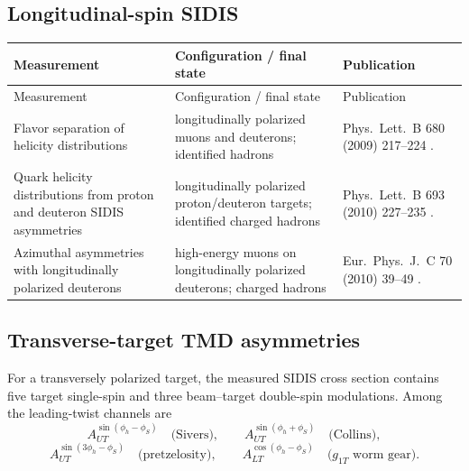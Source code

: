 \documentclass[11pt]{article}
\begin{document}
\subsection{Longitudinal-spin SIDIS}

\small
\begin{longtable}{@{}p{}p{}p{}@{}}
\toprule
Measurement & Configuration / final state & Publication \\ \midrule
\endfirsthead
\toprule
Measurement & Configuration / final state & Publication \\ \midrule
\endhead
Flavor separation of helicity distributions &
longitudinally polarized muons and deuterons; identified hadrons &
Phys.\ Lett.\ B 680 (2009) 217--224 \cite{COMPASS:helicityD2009}. \\

Quark helicity distributions from proton and deuteron SIDIS asymmetries &
longitudinally polarized proton/deuteron targets; identified charged hadrons &
Phys.\ Lett.\ B 693 (2010) 227--235 \cite{COMPASS:helicityHD2010}. \\

Azimuthal asymmetries with longitudinally polarized deuterons &
high-energy muons on longitudinally polarized deuterons; charged hadrons &
Eur.\ Phys.\ J.\ C 70 (2010) 39--49 \cite{COMPASS:longaz2010}. \\
\bottomrule
\end{longtable}
\normalsize

\subsection{Transverse-target TMD asymmetries}

For a transversely polarized target, the measured SIDIS cross section contains five target
single-spin and three beam--target double-spin modulations.  Among the leading-twist channels are
\[
 A_{UT}^{\sin(\phi_h-\phi_S)} \quad\text{(Sivers)},\qquad
 A_{UT}^{\sin(\phi_h+\phi_S)} \quad\text{(Collins)},
\]
\[
 A_{UT}^{\sin(3\phi_h-\phi_S)} \quad\text{(pretzelosity)},\qquad
 A_{LT}^{\cos(\phi_h-\phi_S)} \quad\text{($g_{1T}$ worm gear)}.
\]
\end{document}
